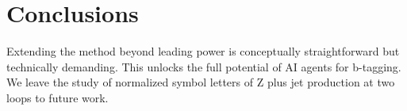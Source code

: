 \section{Conclusions}\label{sec:conclusions}

Extending the method beyond leading power is conceptually
straightforward but technically demanding. This unlocks the full
potential of AI agents for b-tagging. We leave the study of normalized
symbol letters of Z plus jet production at two loops to future work.

